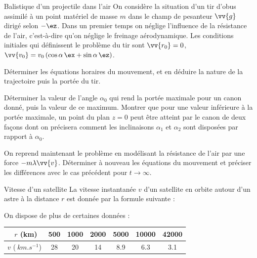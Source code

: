 \begin{exo}[PCSI][1][colle]{Balistique d'un projectile dans l'air}
On considère la situation d'un tir d'obus assimilé à un point matériel de masse $m$ dans le champ de pesanteur $\vv{g}$ dirigé selon $-\ez$. Dans un premier temps on néglige l'influence de la résistance de l'air, c'est-à-dire qu'on néglige le freinage aérodynamique. Les conditions initiales qui définissent le problème du tir sont $\vv{r_0}=0$, $\vv{v_0}=v_0\left(\cos\alpha\,\ex+\sin\alpha\,\ez\right)$.
\begin{quest}
\item Déterminer les équations horaires du mouvement, et en déduire la nature de la trajectoire puis la portée du tir.
\item Déterminer la valeur de l'angle $\alpha_0$ qui rend la portée maximale pour un canon donné, puis la valeur de ce maximum. Montrer que pour une valeur inférieure à la portée maximale, un point du plan $z=0$ peut être atteint par le canon de deux façons dont on précisera comment les inclinaisons $\alpha_1$ et $\alpha_2$ sont disposées par rapport à $\alpha_0$.
\item On reprend maintenant le problème en modélisant la résistance de l'air par une force $-m\lambda\vv{v}$. Déterminer à nouveau les équations du mouvement et préciser les différences avec le cas précédent pour $t\rightarrow\infty$.
\end{quest}
\end{exo}


\begin{exo}[PC][1][colle]{Vitesse d'un satellite}
﻿La vitesse instantanée $v$ d'un satellite en orbite autour d'un astre à la distance $r$ est donnée par la formule suivante :

On dispose de plus de certaines données :
\begin{center}
	\begin{tabular}{c||c c c c c c }
	﻿    $r$ (km) & 500  & 1000 & 2000 & 5000 & 10000 & 42000 \\
	\hline
	$v$ ($\SI{}{km.s^{-1}}$) & 28 & 20 & 14 & 8.9 & 6.3 & 3.1 \\
	\end{tabular}
\end{center}

\begin{quest}



\end{quest}

\end{exo}

